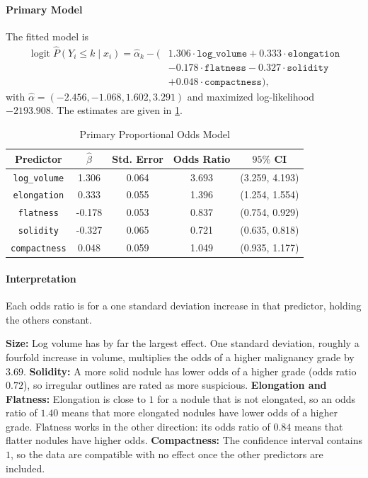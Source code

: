 \documentclass[12pt]{article}
\begin{document}
\paragraph{Primary Model}
The fitted model is
\begin{align*}
  \operatorname{logit} \hat{P}(Y_i \le k \mid x_i) = \hat{\alpha}_k
  - \bigl(&1.306\cdot\texttt{log\_volume}
    + 0.333\cdot\texttt{elongation} \\
    &- 0.178\cdot\texttt{flatness}
    - 0.327\cdot\texttt{solidity} \\
  &+ 0.048\cdot\texttt{compactness}\bigr),
\end{align*}
with $\hat{\alpha} = (-2.456, -1.068, 1.602, 3.291)$ and maximized
log-likelihood $-2193.908$. The estimates are given in
\cref{table:polr_primary}.

\begin{table}[H]
  \centering
  \begin{tabular}{|| c | c | c | c | c ||}
    \hline
    \textbf{Predictor}
    & $\hat{\beta}$
    & \textbf{Std. Error}
    & \textbf{Odds Ratio}
    & \textbf{$95\%$ CI} \\[0.5ex]
    \hline\hline
    \texttt{log\_volume} & 1.306 & 0.064 & 3.693 & (3.259, 4.193) \\
    \texttt{elongation} & 0.333 & 0.055 & 1.396 & (1.254, 1.554) \\
    \texttt{flatness} & -0.178 & 0.053 & 0.837 & (0.754, 0.929) \\
    \texttt{solidity} & -0.327 & 0.065 & 0.721 & (0.635, 0.818) \\
    \texttt{compactness} & 0.048 & 0.059 & 1.049 & (0.935, 1.177) \\
    \hline
  \end{tabular}
  \caption{Primary Proportional Odds Model}
  \label{table:polr_primary}
\end{table}

\paragraph{Interpretation}
Each odds ratio is for a one standard deviation increase in that
predictor, holding the others constant.
\begin{itemize}
    \ii \textbf{Size:} Log volume has by far the largest effect. One
    standard deviation, roughly a fourfold increase in volume,
    multiplies the odds of a higher malignancy grade by $3.69$.
    \ii \textbf{Solidity:} A more solid nodule has lower odds of a
    higher grade (odds ratio $0.72$), so irregular outlines are rated
    as more suspicious.
    \ii \textbf{Elongation and Flatness:} Elongation is close to $1$
    for a nodule that is not elongated, so an odds ratio of $1.40$
    means that more elongated nodules have lower odds of a higher
    grade. Flatness works in the other direction: its odds ratio of
    $0.84$ means that flatter nodules have higher odds.
    \ii \textbf{Compactness:} The confidence interval contains $1$, so
    the data are compatible with no effect once the other predictors
    are included.
\end{itemize}
\end{document}
